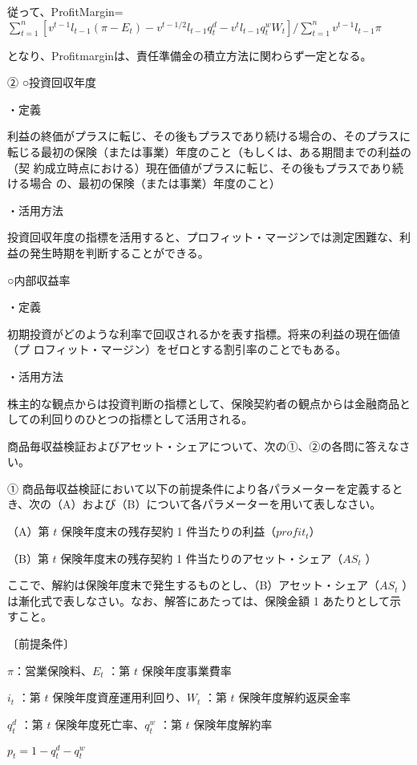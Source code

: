 \documentclass[report,gutter=10mm,fore-edge=10mm,uplatex,dvipdfmx]{jlreq}
\begin{document}
従って、ProfitMargin= $ \sum^n_{t=1}[v^{t-1}l_{t-1}(\pi-E_t)-v^{t-1/2}l_{t-1}q_t^d-v^tl_{t-1}q_t^wW_t] / \sum^n_{t=1}v^{t-1}l_{t-1}\pi$

となり、Profitmarginは、責任準備金の積立方法に関わらず一定となる。

②
○投資回収年度

・定義

利益の終価がプラスに転じ、その後もプラスであり続ける場合の、そのプラスに
転じる最初の保険（または事業）年度のこと（もしくは、ある期間までの利益の（契
約成立時点における）現在価値がプラスに転じ、その後もプラスであり続ける場合
の、最初の保険（または事業）年度のこと）

・活用方法

投資回収年度の指標を活用すると、プロフィット・マージンでは測定困難な、利
益の発生時期を判断することができる。

○内部収益率

・定義

初期投資がどのような利率で回収されるかを表す指標。将来の利益の現在価値（プ
ロフィット・マージン）をゼロとする割引率のことでもある。

・活用方法

株主的な観点からは投資判断の指標として、保険契約者の観点からは金融商品と
しての利回りのひとつの指標として活用される。


商品毎収益検証およびアセット・シェアについて、次の①、②の各問に答えなさい。

① 商品毎収益検証において以下の前提条件により各パラメーターを定義するとき、次の（A）および（B）について各パラメーターを用いて表しなさい。

（A）第 $t$ 保険年度末の残存契約 1 件当たりの利益（$profit_t$）

（B）第 $t$ 保険年度末の残存契約 1 件当たりのアセット・シェア（$AS_t$ ）

ここで、解約は保険年度末で発生するものとし、（B）アセット・シェア（$AS_t$ ）は漸化式で表しなさい。なお、解答にあたっては、保険金額 1 あたりとして示すこと。

〔前提条件〕

$\pi$：営業保険料、$E_t$ ：第 $t$ 保険年度事業費率

$i_t$ ：第 $t$ 保険年度資産運用利回り、$W_t$ ：第 $t$ 保険年度解約返戻金率

$q^d_t$ ：第 $t$ 保険年度死亡率、$q^w_t$ ：第 $t$ 保険年度解約率

$p_t = 1 - q^d_t - q^w_t$
\end{document}
